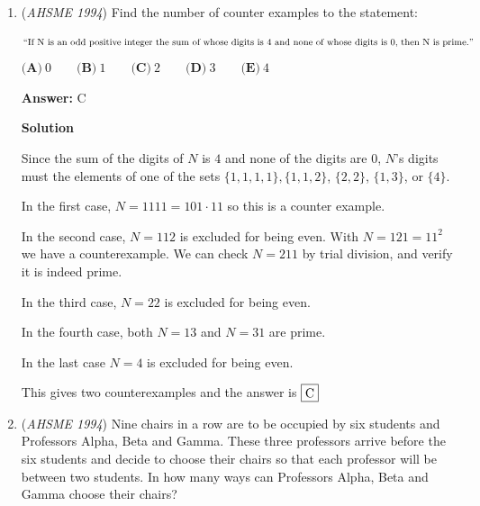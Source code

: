 \begin{enumerate}
 $\textbf{(A)}\ \frac{1}{4} \qquad\textbf{(B)}\ \frac{1}{3} \qquad\textbf{(C)}\ \frac{1}{2} \qquad\textbf{(D)}\ 2 \qquad\textbf{(E)}\ 4$

 \textbf{Answer: }B



\textbf{Solution}

Let $y=xr, z=xr^2$. Since $x, 2y, 3z$ are an arithmetic sequence, there is a common difference and we have $2xr-x=3xr^2-2xr$. Dividing through by $x$, we get $2r-1=3r^2-2r$ or, rearranging, $(r-1)(3r-1)=0$. Since we are given $x\neq y\implies r\neq 1$, the answer is $\boxed{\textbf{(B)}\ \frac{1}{3}}$



	\item (\textit{AHSME 1994}) Find the number of counter examples to the statement:

 \[``\text{If  N is an odd positive integer the sum of whose digits is 4 and none of whose digits is 0, then N is prime}."\]
$\textbf{(A)}\ 0 \qquad\textbf{(B)}\ 1 \qquad\textbf{(C)}\ 2 \qquad\textbf{(D)}\ 3 \qquad\textbf{(E)}\ 4$

 \textbf{Answer: }C



\textbf{Solution}

Since the sum of the digits of $N$ is $4$ and none of the digits are $0$, $N$'s digits must the elements of one of the sets $\{1,1,1,1\},\{1,1,2\}$, $\{2,2\}$, $\{1,3\}$, or $\{4\}$. 

 In the first case, $N = 1111 = 101 \cdot 11$ so this is a counter example.  

 In the second case, $N=112$ is excluded for being even.  With $N=121=11^2$ we have a counterexample.  We can check $N=211$ by trial division, and verify it is indeed prime. 

 In the third case, $N=22$ is excluded for being even.

 In the fourth case, both $N=13$ and $N=31$ are prime.  

 In the last case $N=4$ is excluded for being even.

 This gives two counterexamples and the answer is $\fbox{C}$



	\item (\textit{AHSME 1994}) Nine chairs in a row are to be occupied by six students and Professors Alpha, Beta and Gamma. These three professors arrive before the six students and decide to choose their chairs so that each professor will be between two students. In how many ways can Professors Alpha, Beta and Gamma choose their chairs?



\end{enumerate}

